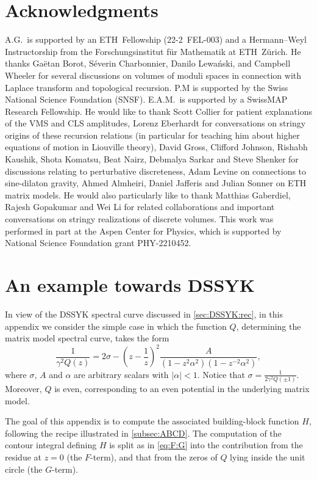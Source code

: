 \documentclass[a4paper,11pt,english]{article}
\theoremstyle{plain}
\theoremstyle{definition}
\theoremstyle{plain}
\begin{document}
\section*{Acknowledgments}
A.G.~is supported by an ETH~Fellowship (22-2~FEL-003) and a Hermann–Weyl Instructorship from the Forschungsinstitut für Mathematik at ETH~Zürich. He thanks Gaëtan Borot, Séverin Charbonnier, Danilo Lewański, and Campbell Wheeler for several discussions on volumes of moduli spaces in connection with Laplace transform and topological recursion. P.M is supported by the Swiss National Science Foundation (SNSF). E.A.M.~is supported by a SwissMAP Research Fellowship. He would like to thank Scott Collier for patient explanations of the VMS and CLS amplitudes, Lorenz Eberhardt for conversations on stringy origins of these recursion relations (in particular for teaching him about higher equations of motion in Liouville theory),  David Gross, Clifford Johnson, Rishabh Kaushik, Shota Komatsu, Beat Nairz, Debmalya Sarkar and Steve Shenker for discussions relating to perturbative discreteness, Adam Levine on connections to sine-dilaton gravity, Ahmed Almheiri, Daniel Jafferis and Julian Sonner on ETH matrix models. He would also particularly like to thank Matthias Gaberdiel, Rajesh Gopakumar and Wei Li for related collaborations and important conversations on stringy realizations of discrete volumes. This work was performed in part at the Aspen Center for Physics, which is supported by National Science Foundation grant PHY-2210452. 

\newpage
\appendix
\section{An example towards DSSYK} 
\label{app:ex}
In view of the DSSYK spectral curve discussed in \cref{sec:DSSYK:rec}, in this appendix we consider the simple case in which the function $Q$, determining the matrix model spectral curve, takes the form
\begin{equation} %
	\frac{1}{\gamma^2 Q(z)}
	=
	2\sigma
	-
	\left( z - \frac{1}{z} \right)^2 \frac{A}{(1-z^2\alpha^2)(1-z^{-2}\alpha^2)} ,
\end{equation}
where $\sigma$, $A$ and $\alpha$ are arbitrary scalars with $|\alpha| < 1$. Notice that $\sigma = \frac{1}{2\gamma^2 Q(\pm 1)}$. Moreover, $Q$ is even, corresponding to an even potential in the underlying matrix model.

The goal of this appendix is to compute the associated building-block function $H$, following the recipe illustrated in \cref{subsec:ABCD}. The computation of the contour integral defining $H$ is split as in \cref{eq:F:G} into the contribution from the residue at $z = 0$ (the $F$-term), and that from the zeros of $Q$ lying inside the unit circle (the $G$-term).
\end{document}
